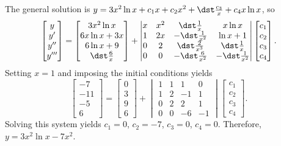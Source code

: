 \documentclass[openany]{book}
\newenvironment{sectionSolutions}{
 \begin{enumerate}[item-label={\thesection.\arabic{enumi}.}]
}{
 \end{enumerate}
}
\begin{document}
\begin{sectionSolutions}
The general solution is $y=3x^2\ln x+c_1x+c_2x^2+\dst\frac{c_3}{ x}
+c_4x\ln x$, so
\[
\begin{bmatrix}y\\y'\\y''\\y'''
\end{bmatrix}=
\begin{bmatrix}
3x^2\ln x\\6x\ln x+3x\\6\ln x+9\\\dst\frac{6}{ x}
\end{bmatrix}+
\begin{vmatrix}
x&x^2&\dst\frac{1}{ x}&x\ln x\\1&2x&-\dst\frac{1}{ x^2}&\ln x+1\\
0&2&\dst\frac{2}{ x^3}&\dst\frac{1}{ x}\\0&0&-\dst\frac{6}{
x^2}&-\dst\frac{1}{ x^2}
\end{vmatrix}
\begin{bmatrix}
c_1\\c_2\\c_3\\c_4
\end{bmatrix}.
\]
Setting $x=1$ and imposing the initial conditions yields
\[
\begin{bmatrix}
-7\\-11\\-5\\6
\end{bmatrix}=
\begin{bmatrix}
0\\3\\9\\6
\end{bmatrix}+
\begin{vmatrix}1&1&1&0\\1&2&-1&1
\\0&2&2&1\\0&0&-6&-1\end{vmatrix}
\begin{bmatrix}
c_1\\c_2\\c_3\\c_4
\end{bmatrix}.
\]
Solving this system yields $c_1=0$, $c_2=-7$, $c_3=0$, $c_4=0$.
Therefore,
 $y=3x^2\ln x-7x^2$.




\end{sectionSolutions}
\end{document}
